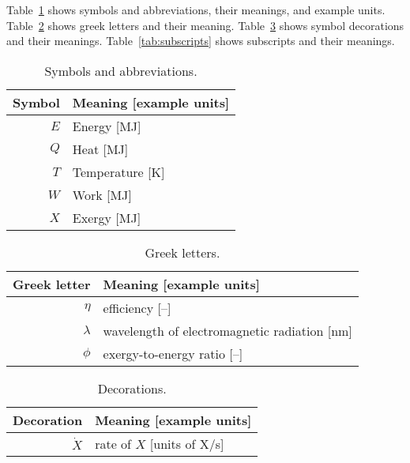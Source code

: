 
Table~\ref{tab:symbols} shows symbols and abbreviations, their meanings, and example units.
Table~\ref{tab:greek} shows greek letters and their meaning.
Table~\ref{tab:decorations} shows symbol decorations and their meanings.
Table~\ref{tab:subscripts} shows subscripts and their meanings.


  
\begin{table}
\centering %
\caption{Symbols and abbreviations.}
\begin{tabular}{r l}
\toprule
Symbol & Meaning [example units] \\
\midrule
$E$ & Energy [MJ] \\
$Q$ & Heat [MJ] \\
$T$ & Temperature [K] \\
$W$ & Work [MJ] \\
$X$ & Exergy [MJ] \\
\bottomrule
\end{tabular}
\label{tab:symbols}
\end{table}



\begin{table}
\centering %
\caption{Greek letters.}
\begin{tabular}{r l}
  \toprule
  Greek letter & Meaning [example units] \\
  \midrule
  $\eta$ & efficiency [--] \\
  $\lambda$ & wavelength of electromagnetic radiation [nm] \\
  $\phi$ & exergy-to-energy ratio [--] \\
  \bottomrule
\end{tabular}
\label{tab:greek}
\end{table}


  
\begin{table}
\centering %
\caption{Decorations.}
\begin{tabular}{r l}
\toprule
Decoration & Meaning [example units] \\
\midrule
$\dot{X}$ & rate of $X$ [units of X/s] \\
\bottomrule
\end{tabular}
\label{tab:decorations}
\end{table}


